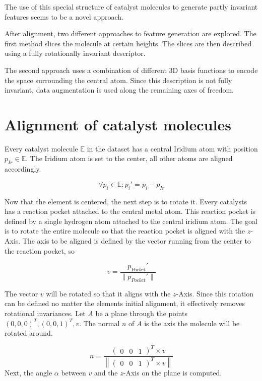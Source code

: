 The use of this special structure of catalyst molecules to generate partly invariant features seems to be a novel approach.

After alignment, two different approaches to feature generation are explored.
The first method slices the molecule at certain heights.
The slices are then described using a fully rotationally invariant descriptor.

The second approach uses a combination of different 3D basis functions to encode the space surrounding the central atom.
Since this description is not fully invariant, data augmentation is used along the remaining axes of freedom.

\section{Alignment of catalyst molecules}

Every catalyst molecule $\mathbb{E}$ in the dataset has a central Iridium atom with position $p_{Ir} \in \mathbb{E}$.
The Iridium atom is set to the center, all other atoms are aligned accordingly.

$$ \forall p_i \in \mathbb{E}: p_i' = p_i - p_{Ir}$$

Now that the element is centered, the next step is to rotate it.
Every catalysts has a reaction pocket attached to the central metal atom.
This reaction pocket is defined by a single hydrogen atom attached to the central iridium atom.
The goal is to rotate the entire molecule so that the reaction pocket is aligned with the $z$-Axis.
The axis to be aligned is defined by the vector running from the center to the reaction pocket, so

$$ v = \frac{p_{Pocket}'}{\| p_{Pocket}'\| } $$

The vector $v$ will be rotated so that it aligns with the $z$-Axis.
Since this rotation can be defined no matter the elements initial alignment, it effectively removes rotational invariances.
Let $A$ be a plane through the points $(0,0,0)^T, (0,0,1)^T, v$.
The normal $n$ of $A$ is the axis the molecule will be rotated around.

$$
n =\frac{\begin{pmatrix}
  0 &
  0 &
  1
\end{pmatrix}^T \times v}{ \left\| \begin{pmatrix}
  0 &
  0 &
  1
\end{pmatrix}^T \times v \right\| }
$$
Next, the angle $\alpha$ between $v$ and the $z$-Axis on the plane is computed.

